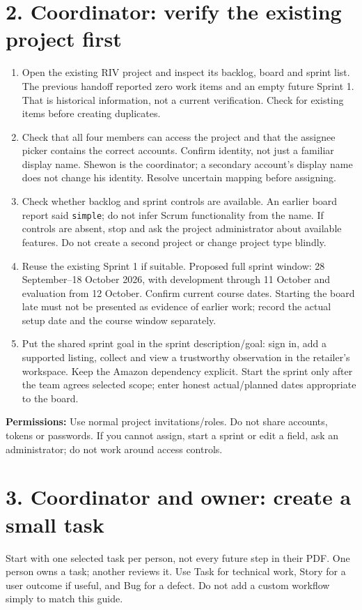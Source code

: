 \section*{2. Coordinator: verify the existing project first}
\begin{enumerate}
\item Open the existing RIV project and inspect its backlog, board and sprint list. The previous handoff reported zero work items and an empty future Sprint 1. That is historical information, not a current verification. Check for existing items before creating duplicates.
\item Check that all four members can access the project and that the assignee picker contains the correct accounts. Confirm identity, not just a familiar display name. Shewon is the coordinator; a secondary account's display name does not change his identity. Resolve uncertain mapping before assigning.
\item Check whether backlog and sprint controls are available. An earlier board report said \texttt{simple}; do not infer Scrum functionality from the name. If controls are absent, stop and ask the project administrator about available features. Do not create a second project or change project type blindly.
\item Reuse the existing Sprint 1 if suitable. Proposed full sprint window: 28 September--18 October 2026, with development through 11 October and evaluation from 12 October. Confirm current course dates. Starting the board late must not be presented as evidence of earlier work; record the actual setup date and the course window separately.
\item Put the shared sprint goal in the sprint description/goal: sign in, add a supported listing, collect and view a trustworthy observation in the retailer's workspace. Keep the Amazon dependency explicit. Start the sprint only after the team agrees selected scope; enter honest actual/planned dates appropriate to the board.
\end{enumerate}
\textbf{Permissions:} Use normal project invitations/roles. Do not share accounts, tokens or passwords. If you cannot assign, start a sprint or edit a field, ask an administrator; do not work around access controls.

\newpage
\section*{3. Coordinator and owner: create a small task}
Start with one selected task per person, not every future step in their PDF. One person owns a task; another reviews it. Use Task for technical work, Story for a user outcome if useful, and Bug for a defect. Do not add a custom workflow simply to match this guide.


